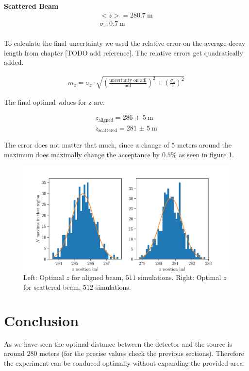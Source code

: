 \documentclass[12pt,a4paper,oneside,english]{article}
\begin{document}
	\textbf{Scattered Beam}
		\begin{align*}
		<z> = \SI{280.7}{\meter}\\
		\sigma _z  : \SI{0.7}{\meter}\\
		\end{align*}
		
		To calculate the final uncertainty we used the relative error on the average decay length from chapter [TODO add reference]. The relative errors get quadratically added.
		
		\begin{align}
			m_z = \sigma _z \cdot \sqrt{ \left(\frac{\text{uncertanty on adl}}{\text{adl}}\right)^2 +  \left(\frac{\sigma_z}{z}\right)^2}
		\end{align}
		
		The final optimal values for z are:
		
		\begin{align*}
			z_{\text{aligned}} =  \SI{286(5)}{\meter}\\
			z_{\text{scattered}} =  \SI{281(5)}{\meter}
		\end{align*}
		
		The error does not matter that much, since a change of $5$ meters around the maximum does maximally change the acceptance by $0.5\%$ as seen in figure \ref{fig:optimalzpos}.
		
\begin{figure}[H]
\centering
	\includegraphics[width=1\linewidth]{images/optimal_zpos.pdf}
	\caption{Left: Optimal $z$ for aligned beam, $511$ simulations. Right: Optimal $z$ for scattered beam, $512$ simulations.}
	\label{fig:optimalzpos}
\end{figure}

\section{Conclusion}
As we have seen the optimal distance between the detector and the source is around 280 meters (for the precise values check the previous sections). Therefore the experiment can be conduced optimally without expanding the provided area.
\end{document}
